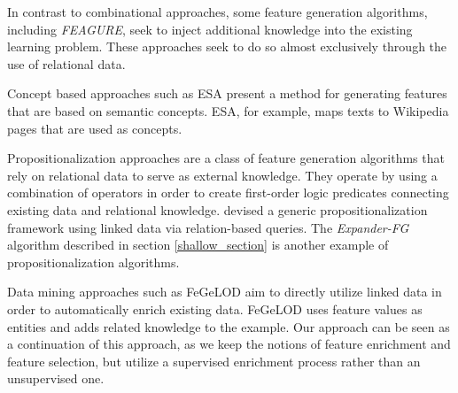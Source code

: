 \documentclass{article}
\theoremstyle{definition}
\begin{document}

In contrast to combinational approaches, some feature generation algorithms, including \emph{FEAGURE}, seek to inject additional knowledge into the existing learning problem. These approaches seek to do so almost exclusively through the use of relational data. 
	
	 Concept based approaches such as ESA \citep{gabrilovich2009wikipediafull} present a method for generating features that are based on semantic concepts. %
	ESA, for example, maps texts to Wikipedia pages that are used as concepts.
	
	 Propositionalization \citep{kramer2000bottom} approaches are a class of feature generation algorithms that rely on relational data to serve as external knowledge. They operate by using a combination of operators in order to create first-order logic predicates connecting existing data and relational knowledge. 
	\cite{cheng2011automatedfull} devised a generic propositionalization framework  using linked data via relation-based queries. %
	The \emph{Expander-FG} algorithm described in section \ref{shallow_section} is another example of propositionalization algorithms.
	
	 Data mining approaches such as FeGeLOD \citep{paulheim2012unsupervisedfull} aim to directly utilize linked data in order to automatically enrich existing data. %
	FeGeLOD uses feature values as entities and adds related knowledge to the example. %
	Our approach can be seen as a continuation of this approach, as we keep the notions of feature enrichment and feature selection, but utilize a supervised enrichment process rather than an unsupervised one.
\end{document}
